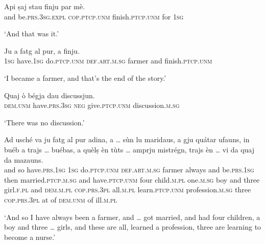 \begin{linenumbers}
\gll    Api ṣaj stau finju par mè.\\
and be.\textsc{prs.3sg.expl} \textsc{cop.ptcp.unm} finish.\textsc{ptcp.unm} for \textsc{1sg}\\
\end{linenumbers}
\medskip
\glt `And that was it.'
\medskip

\begin{linenumbers}
\gll    Ju a fatg al pur, a finju.\\
 \textsc{1sg} have.\textsc{1sg} do.\textsc{ptcp.unm} \textsc{def.art.m.sg} farmer and finish.\textsc{ptcp.unm}  \\
\end{linenumbers}
\medskip
\glt `I became a farmer, and that’s the end of the story.'
\medskip

\begin{linenumbers}
\gll    Quaj ò bégja dau discussjun.\\
 \textsc{dem.unm} have.\textsc{prs.3sg} \textsc{neg} give.\textsc{ptcp.unm} discussion.\textsc{m.sg}\\
\end{linenumbers}
\medskip
\glt `There was no discussion.'
\medskip

\begin{linenumbers}
\gll    Ad usché va ju fatg al pur adina, a … sùn lu maridaus, a gju quátar ufauns, in buéb a trajs … buébas, a quèlṣ èn tùts … amprju mistrégn, trajs èn … vi da quaj da mazauns.\\
and so have.\textsc{prs.1sg} \textsc{1sg} do.\textsc{ptcp.unm} \textsc{def.art.m.sg} farmer always and {} be.\textsc{prs.1sg} then married.\textsc{ptcp.m.sg} and have.\textsc{ptcp.unm} four  child.\textsc{m.pl} one.\textsc{m.sg} boy and three {} girl.\textsc{f.pl} and \textsc{dem.m.pl} \textsc{cop.prs.3pl} all.\textsc{m.pl} {} learn.\textsc{ptcp.unm} profession.\textsc{m.sg} three \textsc{cop.prs.3pl} {} at of \textsc{dem.unm} of ill.\textsc{m.pl}\\
\end{linenumbers}
\medskip 
\glt `And so I have always been a farmer, and … got married, and had four children, a boy and three … girls, and these are all, learned a profession, three are learning to become a nurse.'
\medskip


